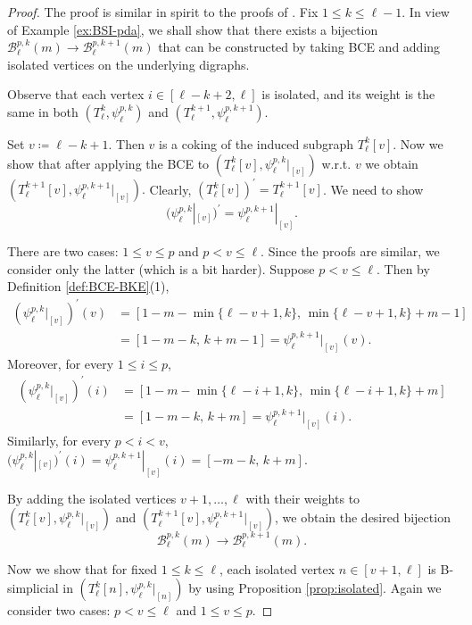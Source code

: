 \documentclass[11pt]{article}
\theoremstyle{definition}
\numberwithin{equation}{section}
\newcommand{\B}{\mathcal{B}}
\begin{document}
 \begin{proof}
 The proof is similar in spirit to the proofs of \cite[Propositions 7.12 and 7.16]{MRT24}. 
Fix $1 \le k \le \ell-1$. 
In view of Example \ref{ex:BSI-pda}, we shall show that there exists a bijection $ \B^{p,k}_\ell(m) \longrightarrow \B^{p,k+1}_\ell(m)$ that can be constructed by taking BCE and adding isolated vertices on the underlying digraphs. 

Observe that each vertex $ i \in [\ell-k+2, \ell] $ is isolated, and its weight is the same in both $ (T_{\ell}^{k}, \psi_{\ell}^{p,k}) $ and $(T_{\ell}^{k+1}, \psi_{\ell}^{p,k+1})$.

Set $ v  \coloneqq  \ell-k+1$. 
Then $v$ is a coking of  the induced subgraph $ T_{\ell}^{k}[v] $. 
Now we show that after applying the BCE to $ (T_{\ell}^{k}[v], \psi_{\ell}^{p, k}|_{[v]}) $ w.r.t. $ v $ 
we obtain $ (T_{\ell}^{k+1}[v], \psi_{\ell}^{p,k+1}|_{[v]}) .$
Clearly, $ (T_{\ell}^{k}[v])^{\prime} = T_{\ell}^{k+1}[v] $. 
We need to show
\begin{equation*}
\label{eq:coking-v}
  (\psi_{\ell}^{p,k}|_{[v]})^{\prime}  =  \psi_{\ell}^{p,k+1}|_{[v]} .
\end{equation*}

There are two cases: $1 \leq   v \leq p$ and $p<   v \leq \ell$. 
Since the proofs are similar, we consider only the latter (which is a bit harder).
Suppose $p<   v \leq \ell$. 
Then by Definition \ref{def:BCE-BKE}(1), 
\begin{align*}
( \psi_{\ell}^{p,k}|_{[v]})^{\prime}(v) &=[1-m-\min\{\ell-v+1, k\},\,\min\{\ell-v+1, k\}+m-1]  \\
&= [1-m-k,\,k+m-1]  = \psi_{\ell}^{p,k+1}|_{[v]}(v). 
\end{align*}
Moreover, for every $ 1 \le i \le p $, 
\begin{align*}
( \psi_{\ell}^{p,k}|_{[v]})^{\prime}(i) &=[1-m-\min\{\ell-i+1, k\},\,\min\{\ell-i+1, k\}+m] \\
&=[1-m-k,\,k+m]   = \psi_{\ell}^{p,k+1}|_{[v]}(i).
\end{align*}
Similarly, for every $ p< i < v $, $( \psi_{\ell}^{p,k}|_{[v]})^{\prime}(i) =  \psi_{\ell}^{p,k+1}|_{[v]}(i)=[-m-k,\,k+m] $.


By adding the isolated vertices $v+1, \dots, \ell $ with their weights to  $ (T_{\ell}^{k}[v], \psi_{\ell}^{p,k}|_{[v]})$ and $  (T_{\ell}^{k+1}[v], \psi_{\ell}^{p,k+1}|_{[v]})$, we obtain the desired bijection 
$$ \B^{p,k}_\ell(m) \longrightarrow \B^{p,k+1}_\ell(m).$$ 

Now we show that for fixed $1 \le k \le \ell$, each isolated vertex $n \in [v+1, \ell] $ is  B-simplicial in  $ (T_{\ell}^{k}[n], \psi_{\ell}^{p,k}|_{[n]})$ by using Proposition \ref{prop:isolated}. 
Again we consider two cases: $p<   v \leq \ell$ and  $1 \leq   v \leq p$. 


\end{proof}
\end{document}
